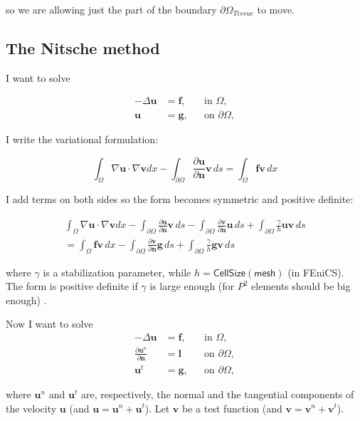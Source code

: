 \documentclass[11pt,a4paper,titlepage]{report}
\begin{document}
so we are allowing just the part of the boundary $\partial \Omega_{Tissue}$ to move.

\subsection{The Nitsche method}
I want to solve

\begin{align}
- \Delta \mathbf{u} &= \mathbf{f},  && \text{in } \Omega, \\
\mathbf{u} &= \mathbf{g}, && \text{on } \partial \Omega,
\end{align}

I write the variational formulation:

\[
\int_\Omega \nabla \mathbf{u} \cdot \nabla \mathbf{v} dx - \int_{\partial \Omega} \frac{\partial \mathbf{u}}{\partial \mathbf{n}} \mathbf{v} \, ds = \int_\Omega \mathbf{fv} \, dx
\]

I add terms on both sides so the form becomes symmetric and positive definite:

\begin{align*}
\int_\Omega \nabla \mathbf{u} \cdot \nabla \mathbf{v} dx
- \int_{\partial \Omega} \frac{\partial \mathbf{u}}{\partial \mathbf{n}} \mathbf{v} \, ds
- \int_{\partial \Omega} \frac{\partial \mathbf{v}}{\partial \mathbf{n}} \mathbf{u} \, ds
+ \int_{\partial \Omega} \frac{\gamma}{h} \mathbf{u} \mathbf{v} \, ds \\
= \int_\Omega \mathbf{fv} \, dx
- \int_{\partial \Omega} \frac{\partial \mathbf{v}}{\partial \mathbf{n}} \mathbf{g} \, ds
+ \int_{\partial \Omega} \frac{\gamma}{h} \mathbf{g} \mathbf{v} \, ds
\end{align*}


where $\gamma$ is a stabilization parameter, while $h = \mathsf{CellSize(mesh)}$ (in FEniCS). The form is positive definite if $\gamma$ is large enough (for $P^2$ elements should be big enough) \cite{}.

Now I want to solve
\begin{align}
- \Delta \mathbf{u} &= \mathbf{f},  && \text{in } \Omega, \\
\frac{\partial \mathbf{u}^n}{\partial \mathbf{n}} &= \mathbf{l} && \text{on } \partial \Omega, \\
\mathbf{u}^t &= \mathbf{g}, && \text{on } \partial \Omega,
\end{align}

where $\mathbf{u}^n$ and $\mathbf{u}^t$ are, respectively, the normal and the tangential components of the velocity $\mathbf{u}$ (and $\mathbf{u} = \mathbf{u}^n + \mathbf{u}^t$). Let $\mathbf{v}$ be a test function (and $\mathbf{v} = \mathbf{v}^n + \mathbf{v}^t$).
\end{document}
